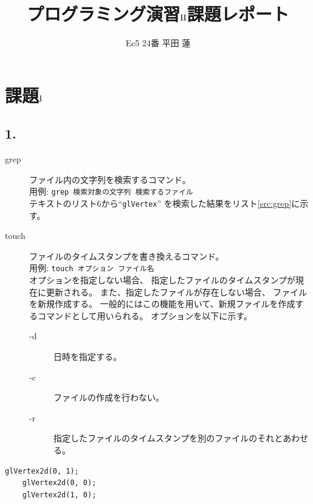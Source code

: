 \documentclass{jsarticle}
\title{プログラミング演習$\rm I\hspace{-.01em}I$課題レポート}
\author{Ec5 24番 平田 蓮}
\date{}
\begin{document}
\maketitle
\section*{課題$\rm I$}
    \subsection*{1.}
        \begin{description}
            \item[grep]{
                ファイル内の文字列を検索するコマンド。\cite{grep} \\
                用例: \verb|grep 検索対象の文字列 検索するファイル| \\
                テキスト\cite{text}のリスト6から``\verb|glVertex|''
                を検索した結果をリスト\ref{src:grep}に示す。
            }
            \item[touch]{
                ファイルのタイムスタンプを書き換えるコマンド。\cite{touch} \\
                用例: \verb|touch オプション ファイル名| \\
                オプションを指定しない場合、
                指定したファイルのタイムスタンプが現在に更新される。
                また、指定したファイルが存在しない場合、
                ファイルを新規作成する。
                一般的にはこの機能を用いて、新規ファイルを作成するコマンドとして用いられる。
                オプションを以下に示す。
                \begin{description}
                    \item[-d] 日時を指定する。
                    \item[-c] ファイルの作成を行わない。
                    \item[-r] 指定したファイルのタイムスタンプを別のファイルのそれとあわせる。
                \end{description}
            }
        \end{description}
        \begin{lstlisting}[caption=grepコマンドの出力, label=src:grep]
    glVertex2d(0, 1);
    glVertex2d(0, 0);
    glVertex2d(1, 0);\end{lstlisting}
\end{document}
